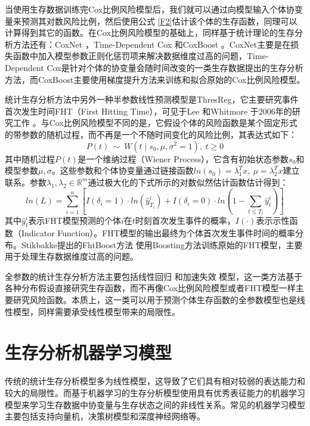 当使用生存数据训练完Cox比例风险模型后，我们就可以通过向模型输入个体协变量来预测其对数风险比例，然后使用公式 \eqref{F2}估计该个体的生存函数，同理可以计算得到其它的函数。在Cox比例风险模型的基础上，同样基于统计理论的生存分析方法还有：CoxNet ，Time-Dependent Cox 和CoxBoost 。CoxNet主要是在损失函数中加入模型参数正则化惩罚项来解决数据维度过高的问题，Time-Dependent Cox是针对个体的协变量会随时间改变的一类生存数据提出的生存分析方法，而CoxBoost主要使用梯度提升方法来训练和拟合原始的Cox比例风险模型。

统计生存分析方法中另外一种半参数线性预测模型是ThresReg，它主要研究事件首次发生时间FHT（First Hitting Time），可见于Lee 和Whitmore 于2006年的研究工作 。与Cox比例风险模型不同的是，它假设个体的风险函数是某个固定形式的带参数的随机过程，而不再是一个不随时间变化的风险比例，其表达式如下：
\begin{equation}
P(t)\ \sim \ W(t \mid s_0, \mu, \sigma^2=1),\ t\ge 0 \label{F7}
\end{equation}
其中随机过程$P(t)$是一个维纳过程（Wiener Process），它含有初始状态参数$s_0$和模型参数$\mu, \sigma$。这些参数和个体协变量通过链接函数$ln⁡(s_0 )=\lambda_1^T x,\ \mu = \lambda_2^T x$建立联系。参数$\lambda_1,\lambda_2\in \mathbb{R}^m$通过极大化的下式所示的对数似然估计函数估计得到：
\begin{equation}
ln(L)=\sum_{i=1}^{n} \left[ I(\delta_i=1)\cdot ln(\hat{y}_{T_i}^i) + I(\delta_i=0) \cdot ln(1-\sum_{t\le T_i}\hat{y}_t^i) \right] \label{F8}
\end{equation}
其中$\hat{y}_t^i$表示FHT模型预测的个体$i$在$t$时刻首次发生事件的概率，$I(\cdot)$表示示性函数（Indicator Function）。FHT模型的输出最终为个体首次发生事件时间的概率分布。Stikbakke提出的FhtBoost方法 使用Boosting方法训练原始的FHT模型，主要用于处理生存数据维度过高的问题。

全参数的统计生存分析方法主要包括线性回归 和加速失效 模型，这一类方法基于各种分布假设直接研究生存函数，而不再像Cox比例风险模型或者FHT模型一样主要研究风险函数。本质上，这一类可以用于预测个体生存函数的全参数模型也是线性模型，同样需要承受线性模型带来的局限性。

\section{生存分析机器学习模型}

传统的统计生存分析模型多为线性模型，这导致了它们具有相对较弱的表达能力和较大的局限性。而基于机器学习的生存分析模型使用具有优秀表征能力的机器学习模型来学习生存数据中协变量与生存状态之间的非线性关系。常见的机器学习模型主要包括支持向量机，决策树模型和深度神经网络等。

